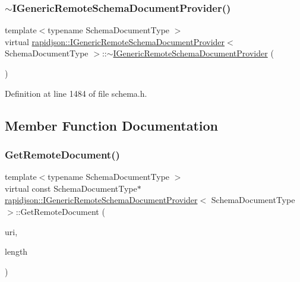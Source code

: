 \subsubsection{\texorpdfstring{$\sim$IGenericRemoteSchemaDocumentProvider()}{~IGenericRemoteSchemaDocumentProvider()}}
{\footnotesize\ttfamily template$<$typename Schema\+Document\+Type $>$ \\
virtual \mbox{\hyperlink{classrapidjson_1_1_i_generic_remote_schema_document_provider}{rapidjson\+::\+I\+Generic\+Remote\+Schema\+Document\+Provider}}$<$ Schema\+Document\+Type $>$\+::$\sim$\mbox{\hyperlink{classrapidjson_1_1_i_generic_remote_schema_document_provider}{I\+Generic\+Remote\+Schema\+Document\+Provider}} (\begin{DoxyParamCaption}{ }\end{DoxyParamCaption})\hspace{0.3cm}{\ttfamily [virtual]}}



Definition at line 1484 of file schema.\+h.


\begin{DoxyCode}{0}

\end{DoxyCode}


\subsection{Member Function Documentation}
\mbox{\label{classrapidjson_1_1_i_generic_remote_schema_document_provider_a41dc360abb19df5a09c1ed1a83ec683c}} 
\subsubsection{\texorpdfstring{GetRemoteDocument()}{GetRemoteDocument()}}
{\footnotesize\ttfamily template$<$typename Schema\+Document\+Type $>$ \\
virtual const Schema\+Document\+Type$\ast$ \mbox{\hyperlink{classrapidjson_1_1_i_generic_remote_schema_document_provider}{rapidjson\+::\+I\+Generic\+Remote\+Schema\+Document\+Provider}}$<$ Schema\+Document\+Type $>$\+::Get\+Remote\+Document (\begin{DoxyParamCaption}\item[{const \mbox{\hyperlink{classrapidjson_1_1_i_generic_remote_schema_document_provider_af1eaa40c0f7d7b778f2f24666d56a441}{Ch}} $\ast$}]{uri,  }\item[{\mbox{\hyperlink{namespacerapidjson_a44eb33eaa523e36d466b1ced64b85c84}{Size\+Type}}}]{length }\end{DoxyParamCaption})\hspace{0.3cm}{\ttfamily [pure virtual]}}



